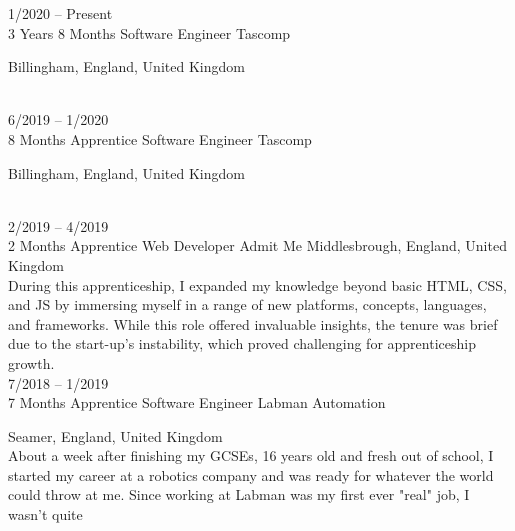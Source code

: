 \documentclass[9pt]{developercv} %
\begin{document}
\begin{entrylist}
	\entry
		{1/2020 -- Present\\3 Years 8 Months}
		{Software Engineer}
		{Tascomp}
		{Billingham, England, United Kingdom\\
		
		\lorem \lorem \lorem \lorem \lorem %
		
		\vspace{0.5em}	

		\hspace{2em}
		}\\
	\entry
		{6/2019 -- 1/2020\\8 Months}
		{Apprentice Software Engineer}
		{Tascomp}
		{Billingham, England, United Kingdom\\
		
		\lorem \lorem \lorem \lorem \lorem %
		
		\vspace{0.5em}	

		\hspace{2em}
		}\\
	\entry
		{2/2019 -- 4/2019\\2 Months}
		{Apprentice Web Developer}
		{Admit Me}
		{Middlesbrough, England, United Kingdom\\ 
		
		During this apprenticeship, I expanded my knowledge beyond basic HTML, CSS, and JS by immersing myself in a range of new platforms, concepts, languages, and frameworks. While this role offered invaluable insights, the tenure was brief due to the start-up's instability, which proved challenging for apprenticeship growth.
		}\\
	\entry
		{7/2018 -- 1/2019\\7 Months}
		{Apprentice Software Engineer}
		{Labman Automation}
		{Seamer, England, United Kingdom\\ 
		
		About a week after finishing my GCSEs, 16 years old and fresh out of school, I started my career at a robotics company and was ready for whatever the world could throw at me. Since working at Labman was my first ever "real" job, I wasn't quite 
		
		\vspace{0.5em}	

		\hspace{2em}
		}\\
\end{entrylist}
\end{document}
